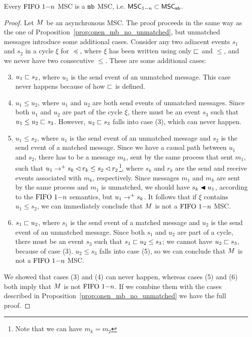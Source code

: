 \begin{proposition} \label{prop:onen_mb_unmatched}
	Every $\text{FIFO } 1\mathsf{-}n$ MSC is a $\mathtt{mb}$ MSC, i.e. $\mathsf{MSC}_{1\mathsf{-}n} \subset \mathsf{MSC}_{\mathtt{mb}}$.
\end{proposition}
\begin{proof}
Let $M$ be an asynchronous MSC. The proof proceeds in the same way as the one of Proposition~\ref{prop:onen_mb_no_unmatched}, but unmatched messages introduce some additional cases. Consider any two adiacent events $s_1$ and $s_2$ in a cycle $\xi$ for $\preceq$, where $\xi$ has been written using only $\sqsubset$ and $\le$, and we never have two consecutive $\le$. These are some additional cases:
\begin{enumerate}\setcounter{enumi}{2}
	\item $u_1 \sqsubset s_2$, where $u_1$ is the send event of an unmatched message. This case never happens because of how $\sqsubset$ is defined.
	\item $u_1 \le u_2$, where $u_1$ and $u_2$ are both send events of unmatched messages. Since both $u_1$ and $u_2$ are part of the cycle $\xi$, there must be an event $s_3$ such that $u_1 \le u_2 \sqsubset s_3$. However, $u_2 \sqsubset s_3$ falls into case (3), which can never happen.
	\item $u_1 \le s_2$, where $u_1$ is the send event of an unmatched message and $s_2$ is the send event of a matched message. Since we have a causal path between $u_1$ and $s_2$, there has to be a message $m_k$, sent by the same process that sent $m_1$, such that $u_1 \to^+ s_k \lhd r_k \le s_2 \lhd r_2$\footnote{Note that we can have $m_k = m_2$}, where $s_k$ and $r_k$ are the send and receive events associated with $m_k$, respectively. Since messages $m_1$ and $m_k$ are sent by the same process and $m_1$ is unmatched, we should have $s_k \blacktriangleleft u_1$, according to the $\text{FIFO } 1\mathsf{-}n$ semantics, but $u_1 \to^+ s_k$. It follows that if $\xi$ contains $u_1 \le s_2$, we can immediately conclude that $M$ is not a $\text{FIFO } 1\mathsf{-}n$ MSC.
	\item $s_1 \sqsubset u_2$,  where $s_1$ is the send event of a matched message and $u_2$ is the send event of an unmatched message. Since both $s_1$ and $u_2$ are part of a cycle, there must be an event $s_3$ such that $s_1 \sqsubset u_2 \le s_3$; we cannot have $u_2 \sqsubset s_3$, because of case (3). $u_2 \le s_3$ falls into case (5), so we can conclude that $M$ is not a $\text{FIFO } 1\mathsf{-}n$ MSC.
\end{enumerate}
We showed that cases (3) and (4) can never happen, whereas cases (5) and (6) both imply that $M$ is not $\text{FIFO } 1\mathsf{-}n$. If we combine them with the cases described in Proposition~\ref{prop:onen_mb_no_unmatched} we have the full proof.
\end{proof}

